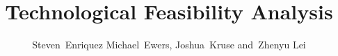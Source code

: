 \documentclass[12pt,journal,compsoc]{IEEEtran}
\begin{document}
%
\title{Technological Feasibility Analysis}
%
%
%
%

\author{Steven~Enriquez
        Michael~Ewers,
        Joshua~Kruse
        and~Zhenyu Lei%
        }

% 
%
\end{document}
